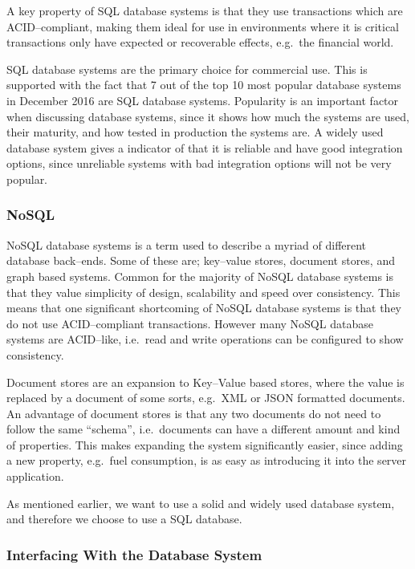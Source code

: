 A key property of SQL database systems is that they use transactions which are ACID--compliant\cite{Haerder:1983:PTD:289.291}, making them ideal for use in environments where it is critical transactions only have expected or recoverable effects, e.g.~the financial world.

SQL database systems are the primary choice for commercial use\cite{dbs_concepts}.
This is supported with the fact that 7 out of the top 10 most popular database systems in December 2016 are SQL database systems\cite{DB_RANKINGS}.
Popularity is an important factor when discussing database systems, since it shows how much the systems are used, their maturity, and how tested in production the systems are.
A widely used database system gives a indicator of that it is reliable and have good integration options,
since unreliable systems with bad integration options will not be very popular. 

\subsubsection*{NoSQL}
NoSQL database systems is a term used to describe a myriad of different database back--ends.
Some of these are; key--value stores, document stores, and graph based systems.
Common for the majority of NoSQL database systems is that they value simplicity of design, scalability and speed over consistency.
This means that one significant shortcoming of NoSQL database systems is that they do not use ACID--compliant transactions.
However many NoSQL database systems are ACID--like, i.e.~read and write operations can be configured to show consistency.

Document stores are an expansion to Key--Value based stores, where the value is replaced by a document of some sorts, e.g.~XML or JSON formatted documents.
An advantage of document stores is that any two documents do not need to follow the same ``schema'', i.e.~documents can have a different amount and kind of properties.
This makes expanding the system significantly easier, since adding a new property, e.g.~fuel consumption, is as easy as introducing it into the server application.

\bigskip
As mentioned earlier, we want to use a solid and widely used database system, and therefore we choose to use a SQL database.

\subsubsection*{Interfacing With the Database System} %

